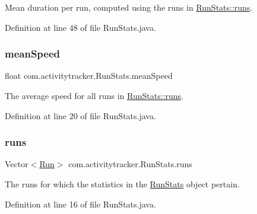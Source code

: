 Mean duration per run, computed using the runs in \mbox{\hyperlink{classcom_1_1activitytracker_1_1_run_stats_a0fd429e9f463ddf4897c507c0e3c0a12}{Run\+Stats\+::runs}}. 

Definition at line 48 of file Run\+Stats.\+java.

\mbox{\label{classcom_1_1activitytracker_1_1_run_stats_a64b9e6daf2be19571b8ad401922762c2}} 
\subsubsection{\texorpdfstring{mean\+Speed}{meanSpeed}}
{\footnotesize\ttfamily float com.\+activitytracker.\+Run\+Stats.\+mean\+Speed\hspace{0.3cm}{\ttfamily [private]}}

The average speed for all runs in \mbox{\hyperlink{classcom_1_1activitytracker_1_1_run_stats_a0fd429e9f463ddf4897c507c0e3c0a12}{Run\+Stats\+::runs}}. 

Definition at line 20 of file Run\+Stats.\+java.

\mbox{\label{classcom_1_1activitytracker_1_1_run_stats_a0fd429e9f463ddf4897c507c0e3c0a12}} 
\subsubsection{\texorpdfstring{runs}{runs}}
{\footnotesize\ttfamily Vector$<$\mbox{\hyperlink{classcom_1_1activitytracker_1_1_run}{Run}}$>$ com.\+activitytracker.\+Run\+Stats.\+runs\hspace{0.3cm}{\ttfamily [private]}}

The runs for which the statistics in the \mbox{\hyperlink{classcom_1_1activitytracker_1_1_run_stats}{Run\+Stats}} object pertain. 

Definition at line 16 of file Run\+Stats.\+java.

\mbox{\label{classcom_1_1activitytracker_1_1_run_stats_a1108dd2b031415da72508a5172335dd4}} 
